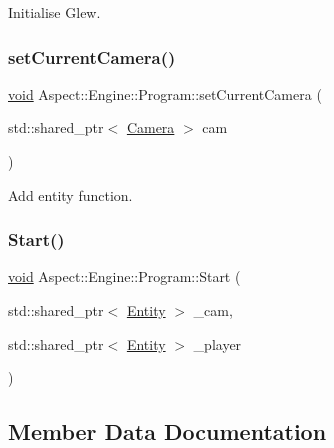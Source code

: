 Initialise Glew. 

\mbox{\label{class_aspect_1_1_engine_1_1_program_a2226e1a84c31b158c05492c9db9de1a2}} 
\subsubsection{\texorpdfstring{set\+Current\+Camera()}{setCurrentCamera()}}
{\footnotesize\ttfamily \mbox{\hyperlink{_s_d_l__opengles2__gl2ext_8h_ae5d8fa23ad07c48bb609509eae494c95}{void}} Aspect\+::\+Engine\+::\+Program\+::set\+Current\+Camera (\begin{DoxyParamCaption}\item[{std\+::shared\+\_\+ptr$<$ \mbox{\hyperlink{class_aspect_1_1_engine_1_1_camera}{Camera}} $>$}]{cam }\end{DoxyParamCaption})}



Add entity function. 

\mbox{\label{class_aspect_1_1_engine_1_1_program_acd8c11ab08516997e18bc97412cb65cc}} 
\subsubsection{\texorpdfstring{Start()}{Start()}}
{\footnotesize\ttfamily \mbox{\hyperlink{_s_d_l__opengles2__gl2ext_8h_ae5d8fa23ad07c48bb609509eae494c95}{void}} Aspect\+::\+Engine\+::\+Program\+::\+Start (\begin{DoxyParamCaption}\item[{std\+::shared\+\_\+ptr$<$ \mbox{\hyperlink{class_aspect_1_1_engine_1_1_entity}{Entity}} $>$}]{\+\_\+cam,  }\item[{std\+::shared\+\_\+ptr$<$ \mbox{\hyperlink{class_aspect_1_1_engine_1_1_entity}{Entity}} $>$}]{\+\_\+player }\end{DoxyParamCaption})}



\subsection{Member Data Documentation}
\mbox{\label{class_aspect_1_1_engine_1_1_program_a674502c50c3ab53a86dd2d7966b2506d}} 
